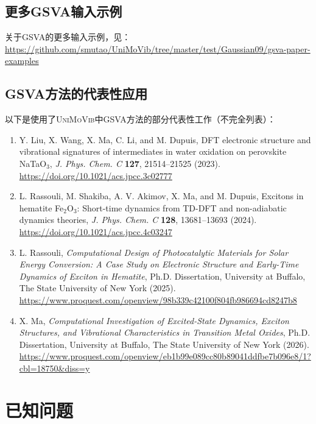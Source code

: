 \documentclass[12pt,a4paper,openany,twoside,cap,UTF8]{ctexbook}
\begin{document}
\section{更多GSVA输入示例 } \label{sec:gsva-more}

关于GSVA的更多输入示例，见： \\
\href{https://github.com/smutao/UniMoVib/tree/master/test/Gaussian09/gsva-paper-examples} {https://github.com/smutao/UniMoVib/tree/master/test/Gaussian09/gsva-paper-examples}


\section{GSVA方法的代表性应用} \label{sec:gsva-cite}

以下是使用了\textsc{UniMoVib}中GSVA方法的部分代表性工作（不完全列表）：
\begin{enumerate}
\item Y. Liu, X. Wang, X. Ma, C. Li, and M. Dupuis, DFT electronic structure and vibrational signatures of intermediates in water oxidation on perovskite NaTaO$_3$, \textit{J. Phys. Chem. C} \textbf{127}, 21514--21525 (2023). \url{https://doi.org/10.1021/acs.jpcc.3c02777}
\item L. Rassouli, M. Shakiba, A. V. Akimov, X. Ma, and M. Dupuis, Excitons in hematite Fe$_2$O$_3$: Short-time dynamics from TD-DFT and non-adiabatic dynamics theories, \textit{J. Phys. Chem. C} \textbf{128}, 13681--13693 (2024). \url{https://doi.org/10.1021/acs.jpcc.4c03247}
\item L. Rassouli, \textit{Computational Design of Photocatalytic Materials for Solar Energy Conversion: A Case Study on Electronic Structure and Early-Time Dynamics of Exciton in Hematite}, Ph.D. Dissertation, University at Buffalo, The State University of New York (2025). \url{https://www.proquest.com/openview/98b339c42100f804fb986694cd8247b8}
\item X. Ma, \textit{Computational Investigation of Excited-State Dynamics, Exciton Structures, and Vibrational Characteristics in Transition Metal Oxides}, Ph.D. Dissertation, University at Buffalo, The State University of New York (2026). \url{https://www.proquest.com/openview/eb1b99e089cc80b89041ddfbe7b096e8/1?cbl=18750&diss=y}
\end{enumerate}


\chapter{已知问题} \label{part:problem}
\end{document}
